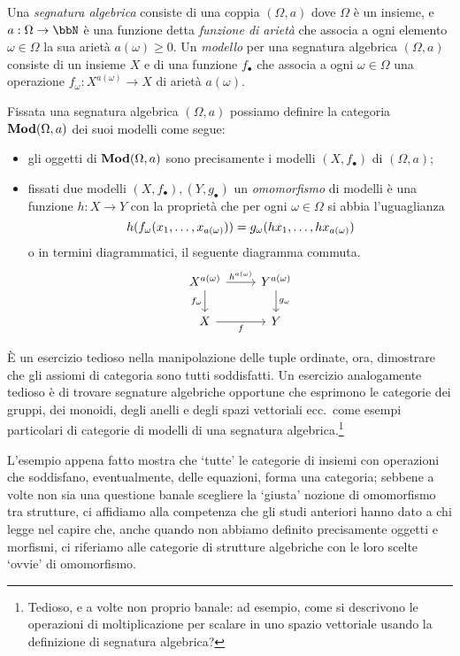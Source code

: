 \begin{example}\label{ex_cat_sigma_strutture}
	Una \emph{segnatura algebrica} consiste di una coppia \((\Omega, a)\) dove \(\Omega\) è un insieme, e \(a : \Omega \to \bbN\) è una funzione detta \emph{funzione di arietà} che associa a ogni elemento \(\omega \in \Omega\) la sua arietà \(a(\omega)\ge 0\). Un \emph{modello} per una segnatura algebrica \((\Omega,a)\) consiste di un insieme \(X\) e di una funzione \(f_\bullet\) che associa a ogni \(\omega\in\Omega\) una operazione \(f_\omega : X^{a(\omega)} \to X\) di arietà \(a(\omega)\).

	Fissata una segnatura algebrica \((\Omega,a)\) possiamo definire la categoria \(\mathbf{Mod}(\Omega,a)\) dei suoi modelli come segue:
	\begin{itemize}
		\item gli oggetti di \(\mathbf{Mod}(\Omega,a)\) sono precisamente i modelli \((X,f_\bullet)\) di \((\Omega,a)\);
		\item fissati due modelli \((X,f_\bullet), (Y,g_\bullet)\) un \emph{omomorfismo} di modelli è una funzione \(h : X\to Y\) con la proprietà che per ogni \(\omega\in\Omega\) si abbia l'uguaglianza
		      \[h(f_\omega(\tup x{a(\omega)},)) = g_\omega(\tup {hx}{a(\omega)},)\]
		      o in termini diagrammatici, il seguente diagramma commuta.
		      \[
			      \begin{tikzcd}
				      X^{a(\omega)} \ar{r}{h^{a(\omega)}} \ar[d, "f_\omega"'] & Y^{a(\omega)} \ar{d}{g_\omega} \\
				      X \ar[r, "f"']& Y
			      \end{tikzcd}
		      \]
	\end{itemize}
\end{example}
\`E un esercizio tedioso nella manipolazione delle tuple ordinate, ora, dimostrare che gli assiomi di categoria sono tutti soddisfatti. Un esercizio analogamente tedioso è di trovare segnature algebriche opportune che esprimono le categorie dei gruppi, dei monoidi, degli anelli e degli spazi vettoriali ecc.\ come esempi particolari di categorie di modelli di una segnatura algebrica.\footnote{Tedioso, e a volte non proprio banale: ad esempio, come si descrivono le operazioni di moltiplicazione per scalare in uno spazio vettoriale usando la definizione di segnatura algebrica?}
\begin{notation}
	L'esempio appena fatto mostra che `tutte' le categorie di insiemi con operazioni che soddisfano, eventualmente, delle equazioni, forma una categoria; sebbene a volte non sia una questione banale scegliere la `giusta' nozione di omomorfismo tra strutture, ci affidiamo alla competenza che gli studi anteriori hanno dato a chi legge nel capire che, anche quando non abbiamo definito precisamente oggetti e morfismi, ci riferiamo alle categorie di strutture algebriche con le loro scelte `ovvie' di omomorfismo.
\end{notation}
